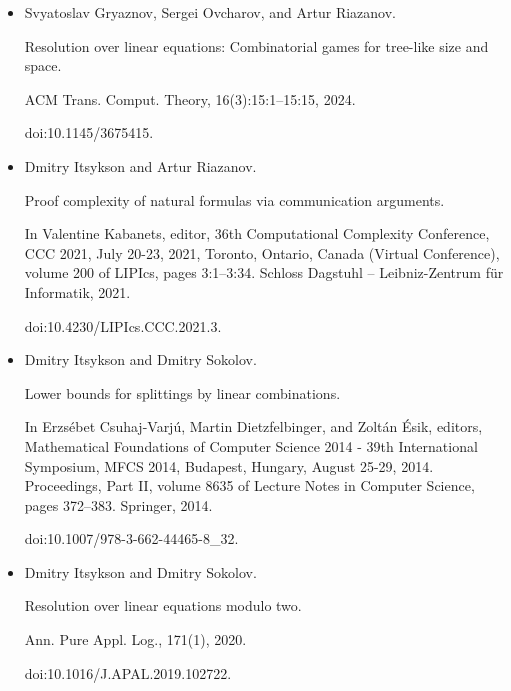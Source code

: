 \begin{itemize}
doi:10.1145/3717823.3718229.





\item 
[22]

Svyatoslav Gryaznov, Sergei Ovcharov, and Artur Riazanov.


Resolution over linear equations: Combinatorial games for tree-like
size and space.


ACM Trans. Comput. Theory, 16(3):15:1–15:15, 2024.


doi:10.1145/3675415.





\item 
[23]

Dmitry Itsykson and Artur Riazanov.


Proof complexity of natural formulas via communication arguments.


In Valentine Kabanets, editor, 36th Computational Complexity
Conference, CCC 2021, July 20-23, 2021, Toronto, Ontario, Canada (Virtual
Conference), volume 200 of LIPIcs, pages 3:1–3:34. Schloss Dagstuhl
– Leibniz-Zentrum für Informatik, 2021.


doi:10.4230/LIPIcs.CCC.2021.3.





\item 
[24]

Dmitry Itsykson and Dmitry Sokolov.


Lower bounds for splittings by linear combinations.


In Erzsébet Csuhaj-Varjú, Martin Dietzfelbinger, and
Zoltán Ésik, editors, Mathematical Foundations of Computer
Science 2014 - 39th International Symposium, MFCS 2014, Budapest, Hungary,
August 25-29, 2014. Proceedings, Part II, volume 8635 of Lecture
Notes in Computer Science, pages 372–383. Springer, 2014.


doi:10.1007/978-3-662-44465-8\_32.





\item 
[25]

Dmitry Itsykson and Dmitry Sokolov.


Resolution over linear equations modulo two.


Ann. Pure Appl. Log., 171(1), 2020.


doi:10.1016/J.APAL.2019.102722.






\end{itemize}
